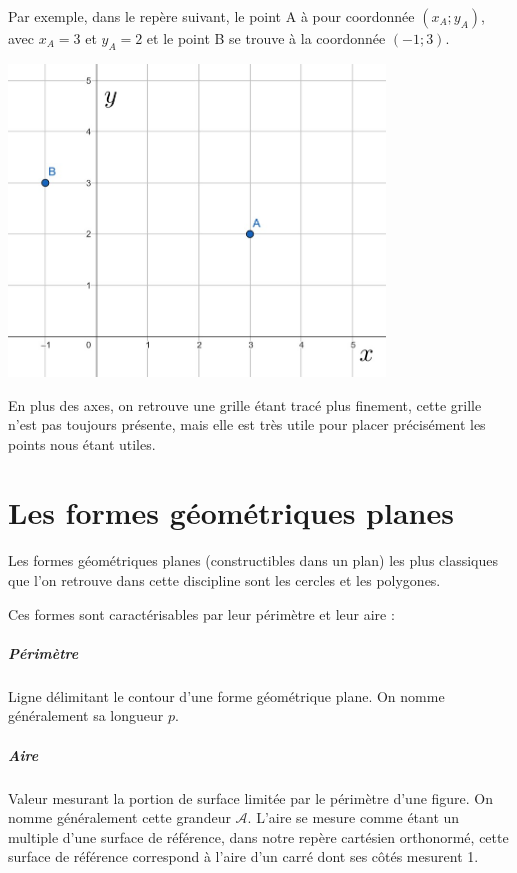 \documentclass[a4paper, twoside]{article}
\begin{document}
\medbreak

Par exemple, dans le repère suivant, le point A à pour coordonnée $(x_A ; y_A)$,
avec $x_A = 3$ et $y_A = 2$ et le point B se trouve à la coordonnée $(-1 ; 3)$.

\begin{center}
	\includegraphics[width=10cm]{Image/repere_cartesien_orthonorme.jpg}
\end{center}

En plus des axes, on retrouve une grille étant tracé plus finement,
cette grille n'est pas toujours présente,
mais elle est très utile pour placer précisément les points nous étant utiles.

\newpage


\section{Les formes géométriques planes}

Les formes géométriques planes (constructibles dans un plan) 
les plus classiques que l'on retrouve dans cette discipline
sont les cercles et les polygones.

\medbreak

Ces formes sont caractérisables par leur périmètre et leur aire :

\vspace{-0.2cm}

\subparagraph*{Périmètre} Ligne délimitant le contour d'une forme géométrique plane.
On nomme généralement sa longueur $p$.

\vspace{-0.2cm}

\subparagraph*{Aire} Valeur mesurant la portion de surface limitée par le périmètre d'une figure.
On nomme généralement cette grandeur $\mathcal{A}$. L'aire se mesure comme étant un multiple d'une surface
de référence, dans notre repère cartésien orthonormé, cette surface de référence correspond à l'aire
d'un carré dont ses côtés mesurent 1.
\end{document}
